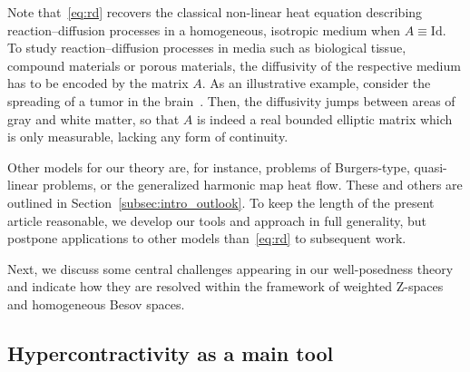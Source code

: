 \documentclass[11pt, leqno]{amsart}
\theoremstyle{definition}
\newcommand{\Z}{\mathrm{Z}}
\newcommand{\Id}{\mathrm{Id}}
\begin{document}
	Note that~\eqref{eq:rd} recovers the classical non-linear heat equation describing reaction--diffusion processes in a homogeneous, isotropic medium when $A \equiv \Id$. To study reaction--diffusion processes in media such as biological tissue, compound materials or porous materials, the diffusivity of the respective medium has to be encoded by the matrix $A$. As an illustrative example, consider the spreading of a tumor in the brain~\cite{Tumor}. Then, the diffusivity jumps between areas of gray and white matter, so that $A$ is indeed a real bounded elliptic matrix which is only measurable, lacking any form of continuity.

	Other models for our theory are, for instance, problems of Burgers-type, quasi-linear problems, or the generalized harmonic map heat flow. These and others are outlined in Section~\ref{subsec:intro_outlook}. To keep the length of the present article reasonable, we develop our tools and approach in full generality, but postpone applications to other models than~\eqref{eq:rd} to subsequent work.

	Next, we discuss some central challenges appearing in our well-posedness theory and indicate how they are resolved within the framework of weighted $\Z$-spaces and homogeneous Besov spaces.

	\subsection{Hypercontractivity as a main tool}
	\label{subsec:intro_hyper}
\end{document}
